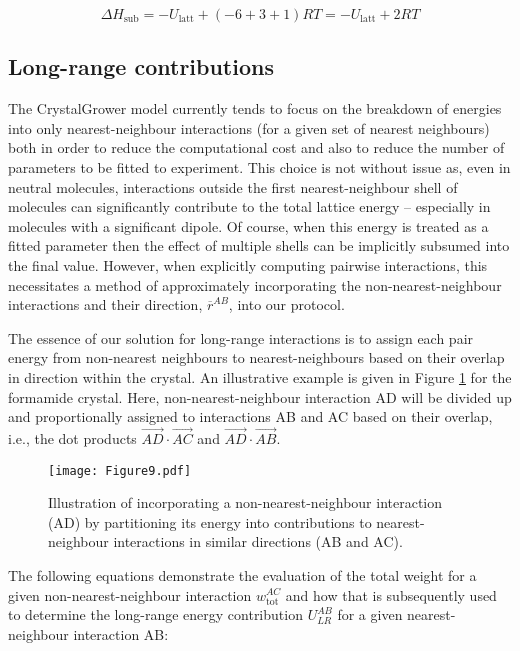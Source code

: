 \documentclass[twoside,twocolumn,9pt]{article}
\begin{document}
\begin{equation}
    \Delta H_{\textrm{sub}} = - U_{\textrm{latt}} + (- 6 + 3 + 1 ) R T = - U_{\textrm{latt}} + 2 R T
\end{equation}

\subsection{Long-range contributions}

The CrystalGrower model currently tends to focus on the breakdown of energies into only nearest-neighbour interactions (for a given set of nearest neighbours) both in order to reduce the computational cost and also to reduce the number of parameters to be fitted to experiment. This choice is not without issue as, even in neutral molecules, interactions outside the first nearest-neighbour shell of molecules can significantly contribute to the total lattice energy – especially in molecules with a significant dipole.
Of course, when this energy is treated as a fitted parameter then the effect of multiple shells can be implicitly subsumed into the final value. However, when explicitly computing pairwise interactions, this necessitates a method of approximately incorporating the non-nearest-neighbour interactions and their direction,  $\overline{r}^{AB}$, into our protocol.

The essence of our solution for long-range interactions is to assign each pair energy from non-nearest neighbours to nearest-neighbours based on their overlap in direction within the crystal. An illustrative example is given in Figure \ref{fig:non_nearest_neighbours} for the formamide crystal. Here, non-nearest-neighbour interaction AD will be divided up and proportionally assigned to interactions AB and AC based on their overlap, i.e., 
the dot products $\overrightarrow{AD} \cdot \overrightarrow{AC}$ and 
$\overrightarrow{AD} \cdot \overrightarrow{AB}$.

\begin{figure}
\centering
  \texttt{[image: Figure9.pdf]}
\caption{Illustration of incorporating a non-nearest-neighbour interaction (AD) by partitioning its energy into contributions to nearest-neighbour interactions in similar directions (AB and AC).}
\label{fig:non_nearest_neighbours}

\end{figure}

The following equations demonstrate the evaluation of the total weight for a given non-nearest-neighbour interaction $w_{\textrm{tot}}^{AC}$ and how that is subsequently used to determine the long-range energy contribution $U_{LR}^{AB}$ for a given nearest-neighbour interaction AB:
\end{document}
